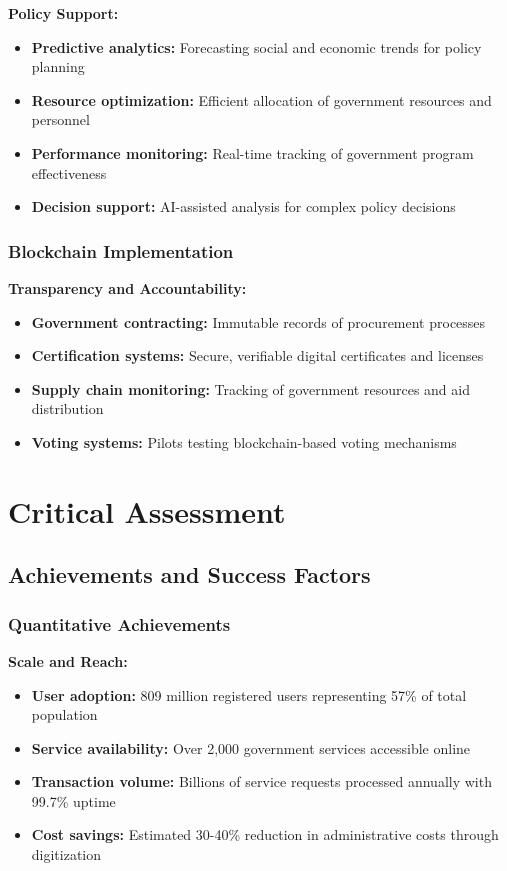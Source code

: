 \documentclass[12pt,a4paper]{article}
\begin{document}
\textbf{Policy Support:}
\begin{itemize}
    \item \textbf{Predictive analytics:} Forecasting social and economic trends for policy planning
    \item \textbf{Resource optimization:} Efficient allocation of government resources and personnel
    \item \textbf{Performance monitoring:} Real-time tracking of government program effectiveness
    \item \textbf{Decision support:} AI-assisted analysis for complex policy decisions
\end{itemize}

\subsubsection{Blockchain Implementation}

\textbf{Transparency and Accountability:}
\begin{itemize}
    \item \textbf{Government contracting:} Immutable records of procurement processes
    \item \textbf{Certification systems:} Secure, verifiable digital certificates and licenses
    \item \textbf{Supply chain monitoring:} Tracking of government resources and aid distribution
    \item \textbf{Voting systems:} Pilots testing blockchain-based voting mechanisms
\end{itemize}

\section{Critical Assessment}

\subsection{Achievements and Success Factors}

\subsubsection{Quantitative Achievements}

\textbf{Scale and Reach:}
\begin{itemize}
    \item \textbf{User adoption:} 809 million registered users representing 57\% of total population
    \item \textbf{Service availability:} Over 2,000 government services accessible online
    \item \textbf{Transaction volume:} Billions of service requests processed annually with 99.7\% uptime
    \item \textbf{Cost savings:} Estimated 30-40\% reduction in administrative costs through digitization
\end{itemize}
\end{document}

